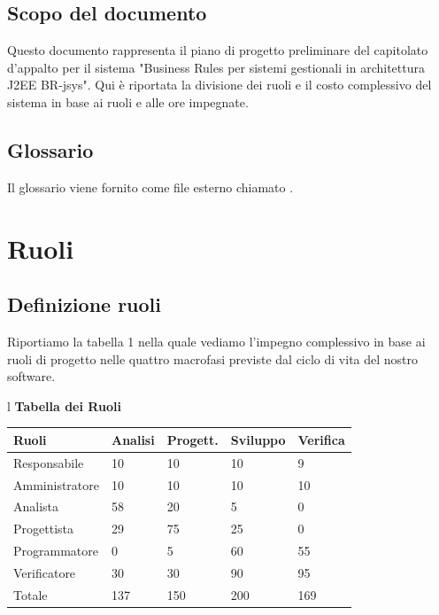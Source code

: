 \documentclass[11pt,titlepage,a4paper]{report}
\begin{document}
\section{Scopo del documento}
Questo documento rappresenta il piano di progetto preliminare
del capitolato d'appalto per il sistema "Business Rules per sistemi
gestionali in architettura J2EE BR-jsys". 
Qui \`e riportata la divisione dei ruoli e il costo complessivo del
sistema in base ai ruoli e alle ore impegnate.

\section{Glossario}
Il glossario viene fornito come file esterno chiamato \Glossario .

\chapter{Ruoli}
\section{Definizione ruoli}
Riportiamo la tabella 1 nella quale vediamo l'impegno
complessivo in base ai ruoli di progetto nelle quattro
macrofasi previste dal ciclo di vita del nostro software.


\begin{table}[hbtp]
\large{
\begin{tabular}{l}
\Large{\textbf{\textsf{Tabella dei Ruoli}}} \\
\begin{tabular}{||p{3cm}||p{2cm}||p{2cm}||p{2cm}||p{2cm}||}
\hline
\textbf{Ruoli} & \textbf{Analisi} & \textbf{Progett.} & \textbf{Sviluppo}
& \textbf{Verifica}\\
\hline
{Responsabile}&10&10&10&9 \\ 
\hline 
{Amministratore} &10&10&10&10\\ 
\hline
{Analista}& 58&20&5&0 \\
\hline
{Progettista}&29&75&25&0 \\
\hline
{Programmatore}&0&5&60&55 \\
\hline
{Verificatore}& 30&30&90&95 \\
\hline
{Totale}& 137&150&200&169 \\
\hline
\end{tabular} \\
\end{tabular}
}

\end{table}
\end{document}
